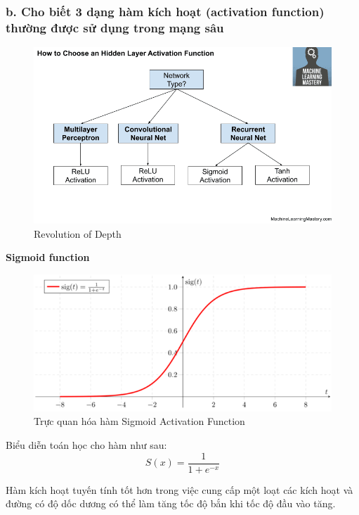 \documentclass{article}
\begin{document}
	\subsubsection{b. Cho biết 3 dạng hàm kích hoạt (activation function) thường được sử dụng trong mạng sâu}
	\begin{figure}[H]
		\centering
		\includegraphics[width=1\linewidth]{images/a5_3.png}
		\caption{Revolution of Depth}
		\label{fig:writing-thesis}
	\end{figure}
	\textbf{Sigmoid function}\newline
	
	\begin{figure}[H]
		\centering
		\includegraphics[width=0.75\linewidth]{images/a5_4.png}
		\caption{Trực quan hóa hàm Sigmoid Activation Function}
		\label{fig:writing-thesis}
	\end{figure}
	Biểu diễn toán học cho hàm như sau:
	$$S(x) = \frac{1}{1 + e^{-x}}$$
	
	Hàm kích hoạt tuyến tính tốt hơn trong việc cung cấp một loạt các kích hoạt và đường có độ dốc dương có thể làm tăng tốc độ bắn khi tốc độ đầu vào tăng.
\end{document}
